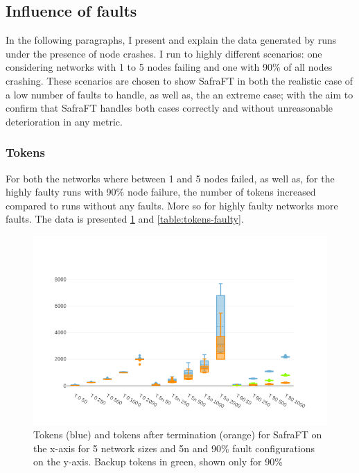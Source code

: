 \subsection{Influence of faults}
In the following paragraphs, I present and explain the data generated by runs under the presence of node crashes.
I run to highly different scenarios: one considering networks with 1 to 5 nodes failing and one with 90\% of all nodes crashing.
These scenarios are chosen to show SafraFT in both the realistic case of a low number of faults to handle, as well as, the an extreme case; with the aim to confirm that SafraFT handles both cases correctly and without unreasonable deterioration in any metric.

\subsubsection{Tokens}
\label{ssec:tokens-faulty}
For both the networks where between 1 and 5 nodes failed, as well as, for the highly faulty runs with 90\% node failure, the number of tokens increased compared to runs without any faults.
More so for highly faulty networks more faults. The data is presented \cref{fig:tokens-and-tokens-after-faulty} and \cref{table:tokens-faulty}. %

\begin{figure}
	\includegraphics{figures/tokens-and-tokens-after-faulty.png}
	\caption{Tokens (blue) and tokens after termination (orange) for SafraFT on the x-axis for 5 network sizes and 5n and 90\% fault configurations on the y-axis.		Backup tokens in green, shown only for 90\%}
	\label{fig:tokens-and-tokens-after-faulty}
\end{figure}

